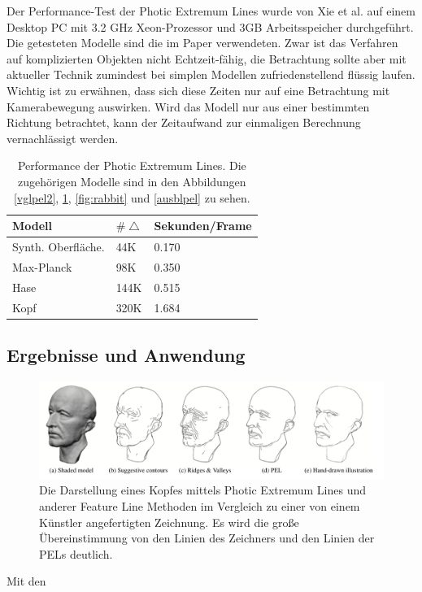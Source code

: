 \documentclass{paperStyle}
\begin{document}
Der Performance-Test der Photic Extremum Lines wurde von Xie et al. \cite{Xie2007} auf einem Desktop PC mit 3.2 GHz Xeon-Prozessor und 3GB Arbeitsspeicher durchgeführt. Die getesteten Modelle sind die im Paper verwendeten. Zwar ist das Verfahren auf komplizierten Objekten nicht Echtzeit-fähig, die Betrachtung sollte aber mit aktueller Technik zumindest bei simplen Modellen zufriedenstellend flüssig laufen.
Wichtig ist zu erwähnen, dass sich diese Zeiten nur auf eine Betrachtung mit Kamerabewegung auswirken. Wird das Modell nur aus einer bestimmten Richtung betrachtet, kann der Zeitaufwand zur einmaligen Berechnung vernachlässigt werden. 
\begin{table}[htb]

\begin{tabular}{|l|ll|}
\hline
Modell & $\#\bigtriangleup$ & Sekunden/Frame\\
\hline
Synth. Oberfläche. & 44K & 0.170 \\
Max-Planck & 98K & 0.350 \\
Hase & 144K & 0.515 \\
Kopf & 320K & 1.684 \\

\hline
\end{tabular}
\caption{Performance der Photic Extremum Lines. Die zugehörigen Modelle sind in den Abbildungen \ref{vglpel2}, \ref{anwpel}, \ref{fig:rabbit} und \ref{ausblpel} zu sehen.  \cite{Xie2007}} 
\label{tab:TableExample}
\end{table}

\subsection{Ergebnisse und Anwendung}
\begin{figure}
	\centering
		\includegraphics[width=0.9\linewidth]{anwpel.png}
	\caption{Die Darstellung eines Kopfes mittels Photic Extremum Lines und anderer Feature Line Methoden im Vergleich zu einer von einem Künstler angefertigten Zeichnung. Es wird die große Übereinstimmung von den Linien des Zeichners und den Linien der PELs deutlich. \cite{Xie2007}}
	\label{anwpel}
\end{figure}
Mit den 
\end{document}
